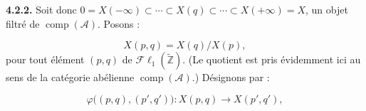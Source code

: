\medskip\noindent\textbf{4.2.2.}\quad
Soit donc
$0=X(-\infty)\subset\cdots\subset X(q)\subset\cdots\subset
X(+\infty)=X$, un objet filtré de $\operatorname{comp}(\mathcal A)$.
Posons :

\begin{equation}
X(p,q)=X(q)/X(p),
\tag{4.2.2.1}
\end{equation}
pour tout élément $(p,q)$ de
$\mathcal{F}\ell_1(\widetilde{\mathbb Z})$. (Le quotient est pris
évidemment ici au sens de la catégorie abélienne
$\operatorname{comp}(\mathcal A)$.) Désignons par :

\begin{equation}
\varphi\bigl((p,q),(p',q')\bigr)\colon
X(p,q)\longrightarrow X(p',q'),
\tag{4.2.2.2}
\end{equation}
\endgroup
